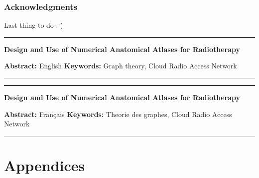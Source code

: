 \documentclass[a4paper,11pt,twoside]{ThesisStyle}
\begin{document}



\setcounter{page}{0}

\section*{Acknowledgments}

Last thing to do :-)
\begin{vcenterpage}
\noindent\rule[2pt]{\textwidth}{0.5pt}
\begin{center}
{\large\textbf{Design and Use of Numerical Anatomical Atlases for Radiotherapy\\}}
\end{center}
{\large\textbf{Abstract:}}
English
{\large\textbf{Keywords:}}
Graph theory, Cloud Radio Access Network
\\
\noindent\rule[2pt]{\textwidth}{0.5pt}
\end{vcenterpage}
\begin{vcenterpage}
\noindent\rule[2pt]{\textwidth}{0.5pt}
\begin{center}
{\large\textbf{Design and Use of Numerical Anatomical Atlases for Radiotherapy\\}}
\end{center}
{\large\textbf{Abstract:}}
Français
{\large\textbf{Keywords:}}
Theorie des graphes, Cloud Radio Access Network
\\
\noindent\rule[2pt]{\textwidth}{0.5pt}
\end{vcenterpage}
\dominitoc
\tableofcontents



\mainmatter









\appendix

\cleardoublepage
\mtcaddpart[Appendices]
\part*{Appendices}



%


\end{document}
